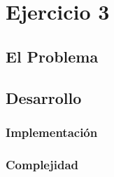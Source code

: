 \section{Ejercicio 3}
\subsection{El Problema}
\subsection{Desarrollo}
\subsubsection{Implementación}
\subsubsection{Complejidad}
